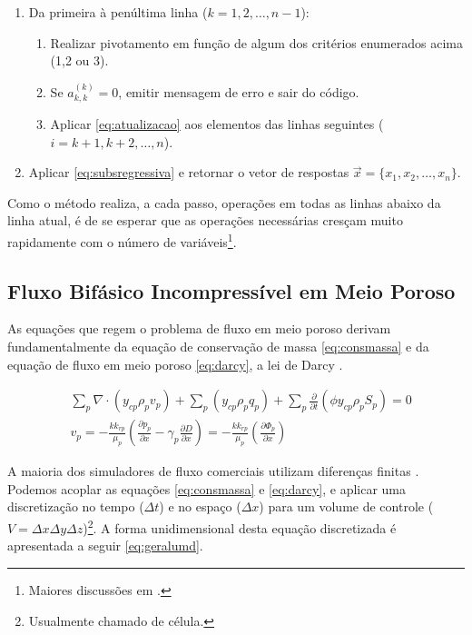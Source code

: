 \documentclass[final,5p]{elsarticle}
\numberwithin{equation}{section}
\begin{document}
            \begin{enumerate}
                \item Da primeira à penúltima linha ($k = 1,2,\ldots,n-1$):
                \begin{enumerate}
                    \item Realizar pivotamento em função de algum dos critérios enumerados acima (1,2 ou 3).
                    \item Se $a^{(k)}_{k,k}=0$, emitir mensagem de erro e sair do código.
                    \item Aplicar \ref{eq:atualizacao} aos elementos das linhas seguintes ($i = k+1,k+2,\ldots,n$).
                \end{enumerate}
                \item Aplicar \ref{eq:subsregressiva} e retornar o vetor de respostas $\overrightarrow{x}=\{x_1,x_2,\ldots,x_n\}$.
            \end{enumerate}

            Como o método realiza, a cada passo, operações em todas as linhas abaixo da linha atual, é de se esperar que as operações necessárias cresçam muito rapidamente com o número de variáveis\footnote{Maiores discussões em \cite{burden2016analise}.}.

    \subsection{Fluxo Bifásico Incompressível em Meio Poroso}

        As equações que regem o problema de fluxo em meio poroso derivam fundamentalmente da equação de conservação de massa \ref{eq:consmassa} e da equação de fluxo em meio poroso \ref{eq:darcy}, a lei de Darcy \cite{dake1983fundamentals}.

        \begin{align}
            &\sum_{p} \nabla \cdot  (y_{cp} \rho_p v_p) + \sum_{p} (y_{cp} \rho_p q_p) + \sum_{p} \frac{\partial}{\partial t} \left( \phi y_{cp} \rho_p S_p\right) = 0 \label{eq:consmassa} \\
            &v_p = - \frac{k k_{rp}}{\mu_p} \left( \frac{\partial p_p}{\partial x} - \gamma_p \frac{\partial D}{\partial x} \right) = - \frac{k k_{rp}}{\mu_p} \left( \frac{\partial \Phi_p}{\partial x} \right)\label{eq:darcy}
        \end{align}

        A maioria dos simuladores de fluxo comerciais utilizam diferenças finitas \cite{computer2022cmg}\cite{schlumberger2009technical}. Podemos acoplar as equações \ref{eq:consmassa} e \ref{eq:darcy}, e aplicar uma discretização no tempo ($\Delta t$) e no espaço ($\Delta x$) para um volume de controle ($V = \Delta x \Delta y \Delta z$)\footnote{Usualmente chamado de célula.}. A forma unidimensional desta equação discretizada é apresentada a seguir \ref{eq:geralumd}.
\end{document}
